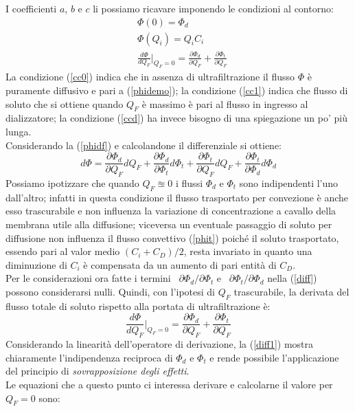I coefficienti $a$, $b$ e $c$ li possiamo ricavare imponendo le condizioni al contorno:
\begin{subequations}\label{cc}
	\begin{align}
		&\Phi(0)=\Phi_d\label{cc0}\\
		&\Phi(Q_i)=Q_i C_i\label{cc1}\\
		&\frac{d\Phi}{dQ_F}\Biggr\rvert_{Q_F=0}=\frac{\partial\Phi_d}{\partial Q_F} + \frac{\partial\Phi_t}{\partial Q_F}\label{ccd}
	\end{align}
\end{subequations}
La condizione (\ref{cc0}) indica che in assenza di ultrafiltrazione il flusso $\Phi$ è puramente diffusivo e pari a (\ref{phidemo}); la condizione (\ref{cc1}) indica che flusso di soluto che si ottiene quando $Q_F$ è massimo è pari al flusso in ingresso al dializzatore; la condizione (\ref{ccd}) ha invece bisogno di una spiegazione un po' più lunga.\\
\newline
Considerando la (\ref{phidf}) e calcolandone il differenziale si ottiene:
\begin{equation}\label{diff}
	d\Phi = \frac{\partial \Phi_d}{\partial Q_F} dQ_F + \frac{\partial \Phi_d}{\partial \Phi_t} d\Phi_t
					+ \frac{\partial \Phi_t}{\partial Q_F} dQ_F + \frac{\partial \Phi_t}{\partial \Phi_d} d\Phi_d
\end{equation}
Possiamo ipotizzare che quando $Q_F\approxeq 0$ i flussi $\Phi_d$ e $\Phi_t$ sono indipendenti l'uno dall'altro; infatti in questa condizione il flusso trasportato per convezione è anche esso trascurabile e non influenza la variazione di concentrazione a cavallo della membrana utile alla diffusione; viceversa un eventuale passaggio di soluto per diffusione non influenza il flusso convettivo (\ref{phit}) poiché il soluto trasportato, essendo pari al valor medio $(C_i+C_D)/2$, resta invariato in quanto una diminuzione di $C_i$ è compensata da un aumento di pari entità di $C_D$.\\
\newline
Per le considerazioni ora fatte i termini ~$\partial \Phi_d/\partial \Phi_t$ e ~$\partial \Phi_t/\partial \Phi_d$ nella (\ref{diff}) possono considerarsi nulli. Quindi, con l'ipotesi di $Q_F$ trascurabile, la derivata del flusso totale di soluto rispetto alla portata di ultrafiltrazione è:\\
\begin{equation}\label{diff1}
	\frac{d\Phi}{dQ_F}\Biggr\rvert_{Q_F=0} = \frac{\partial \Phi_d}{\partial Q_F} + \frac{\partial \Phi_t}{\partial Q_F}
\end{equation}
Considerando la linearità dell'operatore di derivazione, la (\ref{diff1}) mostra chiaramente l'indipendenza reciproca di $\Phi_d$ e $\Phi_t$ e rende possibile l'applicazione del principio di \textit{sovrapposizione degli effetti}.\\
\newline
Le equazioni che a questo punto ci interessa derivare e calcolarne il valore per $Q_F=0$ sono:


